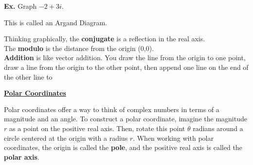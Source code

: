 \documentclass{letter}
\begin{document}
		\textbf{Ex. } Graph $-2 + 3i$.\\
			
			This is called an Argand Diagram.
			
			Thinking graphically, the \textbf{conjugate} is a reflection in the real axis.\\
			The \textbf{modulo} is the distance from the origin (0,0).\\
			\textbf{Addition} is like vector addition. You draw the line from the origin to one point, draw a line from the origin to the other point, then append one line on the end of the other line to 
			
			\underline{\textbf{Polar Coordinates}}
			
			Polar coordinates offer a way to think of complex numbers in terms of a magnitude and an angle. To construct a polar coordinate, imagine the magnitude $r$ as a point on the positive real axis. Then, rotate this point $\theta$ radians around a circle centered at the origin with a radius $r$. When working with polar coordinates, the origin is called the \textbf{pole}, and the positive real axis is called the \textbf{polar axis}.
			
\end{document}

